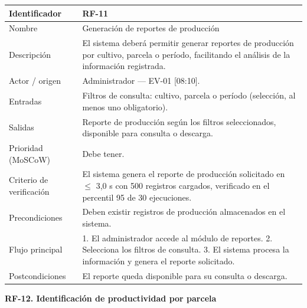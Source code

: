 \documentclass[12pt,a4paper]{article}
\begin{document}
\begin{center}
\begin{longtable}{|p{3.5cm}|p{10.7cm}|}
\hline
Identificador & RF-11 \\
\hline
Nombre & Generación de reportes de producción \\
\hline
Descripción & El sistema deberá permitir generar reportes de producción por cultivo, parcela o período, facilitando el análisis de la información registrada. \\
\hline
Actor / origen & Administrador --- EV-01 [08:10]. \\
\hline
Entradas & Filtros de consulta: cultivo, parcela o período (selección, al menos uno obligatorio). \\
\hline
Salidas & Reporte de producción según los filtros seleccionados, disponible para consulta o descarga. \\
\hline
Prioridad (MoSCoW) & Debe tener. \\
\hline
Criterio de verificación & El sistema genera el reporte de producción solicitado en $\leq$ 3,0 s con 500 registros cargados, verificado en el percentil 95 de 30 ejecuciones. \\
\hline
Precondiciones & Deben existir registros de producción almacenados en el sistema. \\
\hline
Flujo principal & 1. El administrador accede al módulo de reportes. 2. Selecciona los filtros de consulta. 3. El sistema procesa la información y genera el reporte solicitado. \\
\hline
Postcondiciones & El reporte queda disponible para su consulta o descarga. \\
\hline
\end{longtable}
\end{center}

\bigskip
\noindent\textbf{RF-12. Identificación de productividad por parcela}
\label{tab:RF-12}
\end{document}
